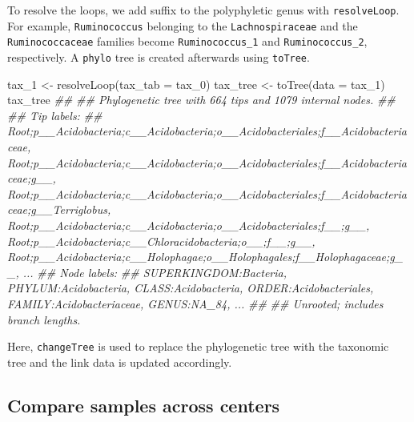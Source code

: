 \documentclass[]{article}
\newcommand{\hlnum}[1]{\textcolor[rgb]{0.816,0.125,0.439}{#1}}%
\newcommand{\hlstr}[1]{\textcolor[rgb]{0.251,0.627,0.251}{#1}}%
\newcommand{\hlcom}[1]{\textcolor[rgb]{0.502,0.502,0.502}{\textit{#1}}}%
\newcommand{\hlopt}[1]{\textcolor[rgb]{0,0,0}{#1}}%
\newcommand{\hlstd}[1]{\textcolor[rgb]{0.251,0.251,0.251}{#1}}%
\newcommand{\hlkwc}[1]{\textcolor[rgb]{0.251,0.251,0.251}{#1}}%
\newcommand{\hlkwd}[1]{\textcolor[rgb]{0.878,0.439,0.125}{#1}}%
\newenvironment{Shaded}{\begin{myshaded}}{\end{myshaded}}
\newcommand{\KeywordTok}[1]{\hlkwd{#1}}
\newcommand{\DataTypeTok}[1]{\hlkwc{#1}}
\newcommand{\DecValTok}[1]{\hlnum{#1}}
\newcommand{\StringTok}[1]{\hlstr{#1}}
\newcommand{\CommentTok}[1]{\hlcom{#1}}
\newcommand{\OperatorTok}[1]{\hlopt{#1}}
\newcommand{\NormalTok}[1]{\hlstd{#1}}
\begin{document}
To resolve the loops, we add suffix to the polyphyletic genus with \texttt{resolveLoop}. For example, \texttt{Ruminococcus} belonging to the \texttt{Lachnospiraceae} and the \texttt{Ruminococcaceae} families become \texttt{Ruminococcus\_1} and \texttt{Ruminococcus\_2}, respectively. A \texttt{phylo} tree is created afterwards using \texttt{toTree}.

\begin{Shaded}
\begin{Highlighting}[]
\NormalTok{tax_}\DecValTok{1}\NormalTok{ <-}\StringTok{ }\KeywordTok{resolveLoop}\NormalTok{(}\DataTypeTok{tax_tab =}\NormalTok{ tax_}\DecValTok{0}\NormalTok{)}
\NormalTok{tax_tree <-}\StringTok{ }\KeywordTok{toTree}\NormalTok{(}\DataTypeTok{data =}\NormalTok{ tax_}\DecValTok{1}\NormalTok{)}
\NormalTok{tax_tree}
\CommentTok{## }
\CommentTok{## Phylogenetic tree with 664 tips and 1079 internal nodes.}
\CommentTok{## }
\CommentTok{## Tip labels:}
\CommentTok{##  Root;p__Acidobacteria;c__Acidobacteria;o__Acidobacteriales;f__Acidobacteriaceae, Root;p__Acidobacteria;c__Acidobacteria;o__Acidobacteriales;f__Acidobacteriaceae;g__, Root;p__Acidobacteria;c__Acidobacteria;o__Acidobacteriales;f__Acidobacteriaceae;g__Terriglobus, Root;p__Acidobacteria;c__Acidobacteria;o__Acidobacteriales;f__;g__, Root;p__Acidobacteria;c__Chloracidobacteria;o__;f__;g__, Root;p__Acidobacteria;c__Holophagae;o__Holophagales;f__Holophagaceae;g__, ...}
\CommentTok{## Node labels:}
\CommentTok{##  SUPERKINGDOM:Bacteria, PHYLUM:Acidobacteria, CLASS:Acidobacteria, ORDER:Acidobacteriales, FAMILY:Acidobacteriaceae, GENUS:NA_84, ...}
\CommentTok{## }
\CommentTok{## Unrooted; includes branch lengths.}
\end{Highlighting}
\end{Shaded}

Here, \texttt{changeTree} is used to replace the phylogenetic tree with the taxonomic
tree and the link data is updated accordingly.

\begin{Shaded}
\end{Shaded}

\hypertarget{compare-samples-across-centers}{%
\subsection{Compare samples across centers}\label{compare-samples-across-centers}}
\end{document}
